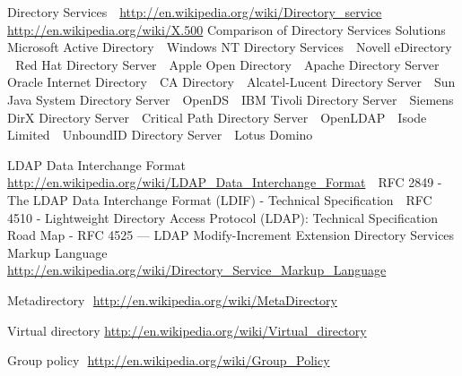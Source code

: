 Directory Services
\newline 
\url{http://en.wikipedia.org/wiki/Directory_service}
\newline 
\url{http://en.wikipedia.org/wiki/X.500}
Comparison of Directory Services Solutions
\newline 
Microsoft Active Directory
\newline 
Windows NT Directory Services
\newline 
Novell eDirectory
\newline 
Red Hat Directory Server
\newline 
Apple Open Directory
\newline 
Apache Directory Server
\newline 
Oracle Internet Directory
\newline 
CA Directory
\newline 
Alcatel-Lucent Directory Server
\newline 
Sun Java System Directory Server
\newline 
OpenDS
\newline 
IBM Tivoli Directory Server
\newline 
Siemens DirX Directory Server
\newline 
Critical Path Directory Server
\newline 
OpenLDAP
\newline 
Isode Limited
\newline 
UnboundID Directory Server
\newline 
Lotus Domino

LDAP Data Interchange Format
\newline 
\url{http://en.wikipedia.org/wiki/LDAP_Data_Interchange_Format}
\newline 
RFC 2849 -  The LDAP Data Interchange Format (LDIF) - Technical Specification
\newline 
RFC 4510 - Lightweight Directory Access Protocol (LDAP): Technical Specification Road Map -           
RFC 4525 — LDAP Modify-Increment Extension
Directory Services Markup Language
\newline 
\url{http://en.wikipedia.org/wiki/Directory_Service_Markup_Language}

Metadirectory
\newline \url{http://en.wikipedia.org/wiki/MetaDirectory}

Virtual directory
\url{http://en.wikipedia.org/wiki/Virtual_directory}

Group policy
\newline \url{http://en.wikipedia.org/wiki/Group_Policy}



